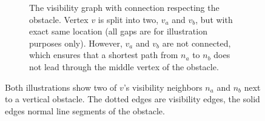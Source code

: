 \begin{figure}[h]
\begin{figcenter}
\begin{subfigure}[t]{.48\textwidth}
\begin{figcenter}
						\end{figcenter}
						\caption{
							The visibility graph with connection respecting the obstacle. Vertex $v$ is split into two, $v_a$ and $v_b$, but with exact same location (all gaps are for illustration purposes only).
							However, $v_a$ and $v_b$ are not connected, which ensures that a shortest path from $n_a$ to $n_b$ does not lead through the middle vertex of the obstacle.
						}
						\label{fig:routing-through-line-obstacle-b}
					\end{subfigure}
				\end{figcenter}
				\caption{
					Both illustrations show two of $v$'s visibility neighbors $n_a$ and $n_b$ next to a vertical obstacle. 
					The dotted edges are visibility edges, the solid edges normal line segments of the obstacle.
				}
				\label{fig:routing-through-line-obstacle}
			\end{figure}
			
